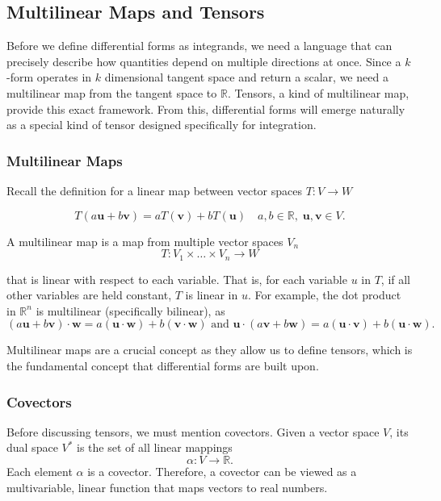 \documentclass[12pt]{article}
\newcommand{\R}{\mathbb{R}}
\newcommand{\bv}[1]{\mathbf{#1}}
\begin{document}
\subsection{Multilinear Maps and Tensors} 

Before we define differential forms as integrands, we need a language that can precisely describe how quantities depend on multiple directions at once. Since a $k$-form operates in $k$ dimensional tangent space and return a scalar, we need a multilinear map from the tangent space to $\R$. Tensors, a kind of multilinear map, provide this exact framework. From this, differential forms will emerge naturally as a special kind of tensor designed specifically for integration.

\subsubsection{Multilinear Maps}

Recall the definition for a linear map between vector spaces $T: V \to W$

\[
T(a\bv{u} + b\bv{v}) = aT(\bv{v})+bT(\bv{u}) \quad a,b \in \R, \; \bv{u},\bv{v} \in V.
\]

A multilinear map is a map from multiple vector spaces $V_n$ 
\[
T: V_1 \times \dots \times V_n \to W
\]

that is linear with respect to each variable. That is, for each variable $u$ in $T$, if all other variables are held constant, $T$ is linear in $u$. For example, the dot product in $\R^n$ is multilinear (specifically bilinear), as
\[
(a\bv{u} + b\bv{v}) \cdot \bv{w} = a(\bv{u} \cdot \bv{w}) + b(\bv{v} \cdot \bv{w}) \text{ and } \bv{u} \cdot (a\bv{v} + b\bv{w}) = a(\bv{u} \cdot \bv{v}) + b(\bv{u} \cdot \bv{w}).
\]

Multilinear maps are a crucial concept as they allow us to define tensors, which is the fundamental concept that differential forms are built upon.

\subsubsection{Covectors}

Before discussing tensors, we must mention covectors. Given a vector space $V$, its dual space $V^*$ is the set of all linear mappings
\[
\alpha: V \to \R.
\]
Each element $\alpha$ is a covector. Therefore, a covector can be viewed as a multivariable, linear function that maps vectors to real numbers.
\end{document}
